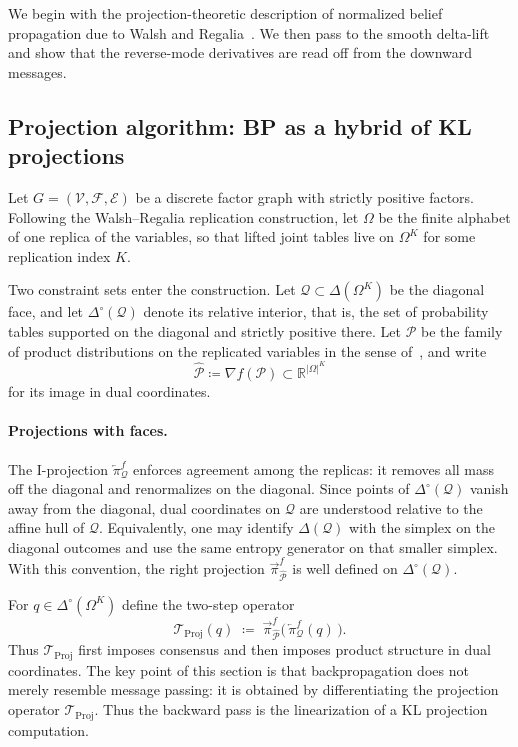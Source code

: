 \documentclass[12pt]{article}
\newcommand{\1}{\mathbb{1}}
\newcommand{\defeq}{\coloneq}
\theoremstyle{definition}
\newcommand{\Iproj}{\overleftarrow{\pi}}     %
\newcommand{\Rproj}{\overrightarrow{\pi}}    %
\begin{document}
We begin with the projection-theoretic description of normalized belief propagation due to Walsh and Regalia~\cite{walsh2010bp}. We then pass to the smooth delta-lift and show that the reverse-mode derivatives are read off from the downward messages.

\subsection{Projection algorithm: BP as a hybrid of KL projections}
\label{subsec:hybrid-proj}

Let $G=(\mathcal V,\mathcal F,\mathcal E)$ be a discrete factor graph with strictly
positive factors. Following the Walsh--Regalia replication construction,
let $\Omega$ be the finite alphabet of one replica of the variables, so that lifted joint tables
live on $\Omega^K$ for some replication index $K$.

Two constraint sets enter the construction. Let $\mathcal Q\subset \Delta(\Omega^K)$ be the diagonal face, and let
$\Delta^\circ(\mathcal Q)$ denote its relative interior, that is, the set of
probability tables supported on the diagonal and strictly positive there.
Let $\mathcal P$ be the family of product distributions on the replicated variables
in the sense of~\cite{walsh2010bp}, and write
\[
\widehat{\mathcal P}\defeq \nabla f(\mathcal P)\subset\mathbb R^{|\Omega|^K}
\]
for its image in dual coordinates.

\paragraph{Projections with faces.}
The I-projection $\Iproj^f_{\mathcal Q}$ enforces agreement among the replicas: it removes all mass off the diagonal and renormalizes on the diagonal. Since points of $\Delta^\circ(\mathcal Q)$ vanish away from the diagonal, dual coordinates on $\mathcal Q$ are understood relative to the affine hull of $\mathcal Q$. Equivalently, one may identify $\Delta(\mathcal Q)$ with the simplex on the diagonal outcomes and use the same entropy generator on that smaller simplex. With this convention, the right projection $\Rproj^f_{\widehat{\mathcal P}}$ is well defined on $\Delta^\circ(\mathcal Q)$.

For $q\in\Delta^\circ(\Omega^K)$ define the two-step operator
\begin{equation*}
\label{eq:TProj-def}
\mathcal{T}_{\mathrm{Proj}}(q)
\;\defeq\;
\Rproj^f_{\widehat{\mathcal P}}\!\big(\,\Iproj^f_{\mathcal Q}(q)\,\big).
\end{equation*}
Thus $\mathcal T_{\mathrm{Proj}}$ first imposes consensus and then imposes product structure in dual coordinates. The key point of this section is that backpropagation does not merely resemble message passing: it is obtained by differentiating the projection operator $\mathcal T_{\mathrm{Proj}}$. Thus the backward pass is the linearization of a KL projection computation.
\end{document}
